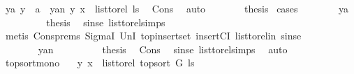 \begin{isabellebody}
\ {\isacharparenleft}{\kern0pt}ya{\isacharparenright}{\kern0pt}\ {\isachardoublequoteopen}y\ {\isacharequal}{\kern0pt}\ a{\isachardoublequoteclose}\ {\isacharbar}{\kern0pt}\ {\isacharparenleft}{\kern0pt}yan{\isacharparenright}{\kern0pt}\ {\isachardoublequoteopen}{\isacharparenleft}{\kern0pt}y{\isacharcomma}{\kern0pt}\ x{\isacharparenright}{\kern0pt}\ {\isasymin}\ list{\isacharunderscore}{\kern0pt}to{\isacharunderscore}{\kern0pt}rel\ ls{\isachardoublequoteclose}\ \isamarkupfalse%
\ Cons\ \isamarkupfalse%
\ auto\isanewline
\ \ \ \ \isamarkupfalse%
\ \isamarkupfalse%
\ {\isacharquery}{\kern0pt}thesis\ \isamarkupfalse%
{\isacharparenleft}{\kern0pt}cases{\isacharparenright}{\kern0pt}\isanewline
\ \ \ \ \ \ \isamarkupfalse%
\ ya\isanewline
\ \ \ \ \ \ \isamarkupfalse%
\ \isamarkupfalse%
\ {\isacharquery}{\kern0pt}thesis\ \isamarkupfalse%
\ sinse\ list{\isacharunderscore}{\kern0pt}to{\isacharunderscore}{\kern0pt}rel{\isachardot}{\kern0pt}simps\isanewline
\ \ \ \ \ \ \ \ \isamarkupfalse%
\ {\isacharparenleft}{\kern0pt}metis\ Cons{\isachardot}{\kern0pt}prems\ SigmaI\ UnI{}\ top{\isacharunderscore}{\kern0pt}insert{\isacharunderscore}{\kern0pt}set\ insertCI\ list{\isacharunderscore}{\kern0pt}to{\isacharunderscore}{\kern0pt}rel{\isacharunderscore}{\kern0pt}in\ sinse{\isacharparenright}{\kern0pt}\ \isanewline
\ \ \ \ \isamarkupfalse%
\isanewline
\ \ \ \ \ \ \isamarkupfalse%
\ yan\isanewline
\ \ \ \ \ \ \isamarkupfalse%
\ \isamarkupfalse%
\ {\isacharquery}{\kern0pt}thesis\ \isamarkupfalse%
\ Cons\ \isamarkupfalse%
\ sinse\ list{\isacharunderscore}{\kern0pt}to{\isacharunderscore}{\kern0pt}rel{\isachardot}{\kern0pt}simps\ \isamarkupfalse%
\ auto\ \isanewline
\ \ \ \ \isamarkupfalse%
\isanewline
\ \ \isamarkupfalse%
\isanewline
{}\isamarkupfalse%
%
\endisatagproof
{\isafoldproof}%
%
\isadelimproof
\isanewline
%
\endisadelimproof
\isanewline
{}\isamarkupfalse%
\ top{\isacharunderscore}{\kern0pt}sort{\isacharunderscore}{\kern0pt}mono{\isacharcolon}{\kern0pt}\isanewline
\ \ \ {\isachardoublequoteopen}{\isacharparenleft}{\kern0pt}y{\isacharcomma}{\kern0pt}\ x{\isacharparenright}{\kern0pt}\ {\isasymin}\ list{\isacharunderscore}{\kern0pt}to{\isacharunderscore}{\kern0pt}rel\ {\isacharparenleft}{\kern0pt}top{\isacharunderscore}{\kern0pt}sort\ G\ ls{\isacharparenright}{\kern0pt}{\isachardoublequoteclose}\isanewline

\end{isabellebody}
